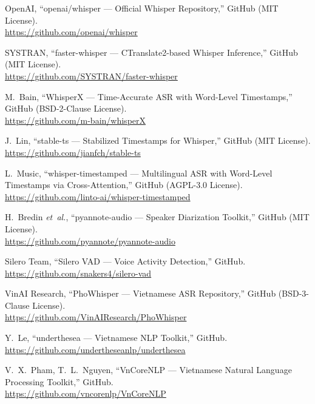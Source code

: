 \documentclass[12pt,a4paper]{article}
\begin{document}
\begin{enumerate}[label={[C\arabic*]}]

\item OpenAI, ``openai/whisper --- Official Whisper Repository,''
GitHub (MIT License).\\
\url{https://github.com/openai/whisper}

\item SYSTRAN, ``faster-whisper --- CTranslate2-based Whisper Inference,''
GitHub (MIT License).\\
\url{https://github.com/SYSTRAN/faster-whisper}

\item M.~Bain, ``WhisperX --- Time-Accurate ASR with Word-Level Timestamps,''
GitHub (BSD-2-Clause License).\\
\url{https://github.com/m-bain/whisperX}

\item J.~Lin, ``stable-ts --- Stabilized Timestamps for Whisper,''
GitHub (MIT License).\\
\url{https://github.com/jianfch/stable-ts}

\item L.~Music, ``whisper-timestamped --- Multilingual ASR with Word-Level Timestamps via Cross-Attention,''
GitHub (AGPL-3.0 License).\\
\url{https://github.com/linto-ai/whisper-timestamped}

\item H.~Bredin \textit{et~al.}, ``pyannote-audio --- Speaker Diarization Toolkit,''
GitHub (MIT License).\\
\url{https://github.com/pyannote/pyannote-audio}

\item Silero Team, ``Silero VAD --- Voice Activity Detection,''
GitHub.\\
\url{https://github.com/snakers4/silero-vad}

\item VinAI Research, ``PhoWhisper --- Vietnamese ASR Repository,''
GitHub (BSD-3-Clause License).\\
\url{https://github.com/VinAIResearch/PhoWhisper}

\item Y.~Le, ``underthesea --- Vietnamese NLP Toolkit,''
GitHub.\\
\url{https://github.com/undertheseanlp/underthesea}

\item V.~X.~Pham, T.~L.~Nguyen, ``VnCoreNLP --- Vietnamese Natural Language Processing Toolkit,''
GitHub.\\
\url{https://github.com/vncorenlp/VnCoreNLP}

\end{enumerate}
\end{document}
